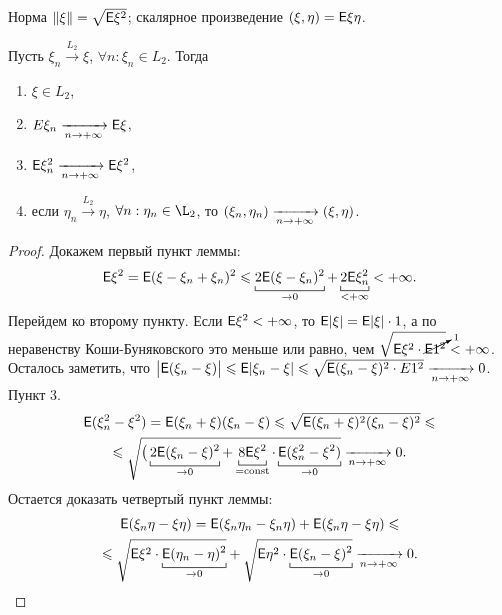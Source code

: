 Норма $ \| \xi \| = \sqrt{\mathsf{E} \xi^2}$;  скалярное произведение $(\xi, \eta) = \mathsf{E} \xi\eta$.
\begin{lemma}
	Пусть $\xi_n \xrightarrow{L_2} \xi$, $\forall n: \xi_n \in L_2$. Тогда
	\begin{enumerate}
		\item $\xi \in L_2$,
		\item $E\xi_n \xrightarrow[n \rightarrow + \infty]{} \mathsf{E} \xi$,
		\item $\mathsf{E} \xi_n^2 \xrightarrow[n \rightarrow + \infty]{} \mathsf{E}\xi^2$,
		\item {если $\eta_n \xrightarrow{L_2} \eta$, $\forall n: \eta_n \in \L_2$, то $(\xi_n, \eta_n) \xrightarrow[n \rightarrow + \infty]{} (\xi, \eta)$.}
	\end{enumerate}
	\begin{proof}
		Докажем первый пункт леммы:
		$$\E \xi^2 = \E ( \xi - \xi_n + \xi_n)^2 \leqslant \underbracket[0.5pt]{2\E( \xi - \xi_n)^2}_{\rightarrow 0} + \underbracket[0.5pt]{2\E \xi_n^2}_{< + \infty} < +\infty.$$
		Перейдем ко второму пункту. Если $\mathsf{E} \xi^2 < + \infty$, то $\mathsf{E} | \xi | = \mathsf{E} | \xi| \cdot 1$, а по неравенству Коши-Буняковского это меньше или равно, чем $\sqrt{\mathsf{E} \xi^2 \cdot \cancelto{1}{\mathsf{E} 1^2}} < + \infty$. Осталось заметить, что $\big| \mathsf{E} ( \xi_n - \xi ) \big| \leqslant \mathsf{E} | \xi_n - \xi | \leqslant \sqrt{\mathsf{E} (\xi_n - \xi)^2 \cdot E 1^2} \xrightarrow[n \rightarrow + \infty]{} 0$.
		Пункт 3. 
		\begin{multline*}
			\E ( \xi_n^2 - \xi^2) = 
			\E ( \xi_n + \xi)(\xi_n - \xi) \leqslant \sqrt{ \E (\xi_n + \xi)^2 (\xi_n - \xi)^2} \leqslant \\ \leqslant
			 \sqrt{\big( \underbracket[0.5pt]{2 \E( \xi_n - \xi)^2}_{\rightarrow 0} + \underbracket[0.5pt]{8\E \xi^2}_{=\const} \cdot \underbracket[0.5pt]{\E (\xi_n^2 - \xi^2)}_{\rightarrow 0}} \limn 0.
		\end{multline*}
		Остается доказать четвертый пункт леммы:
		\begin{multline*}
			\E ( \xi_n \eta - \xi \eta) = 
			\E( \xi_n \eta_n - \xi_n \eta) + \E( \xi_n \eta - \xi \eta) \leqslant  \\ \leqslant
			\sqrt{\E\xi^2 \cdot \underbracket[0.5pt]{\E (\eta_n - \eta)^2}_{\rightarrow 0}} + \sqrt{\E \eta^2 \cdot \underbracket[0.5pt]{\E(\xi_n - \xi)^2}_{\rightarrow 0}} \limn 0.
		\end{multline*}
	\end{proof}
\end{lemma}
